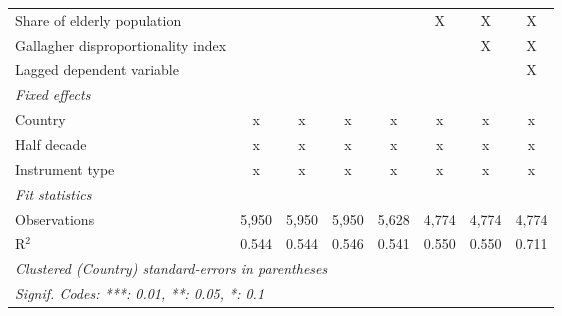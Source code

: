 \begin{tabular}{lccccccc}
   Share of elderly population                                                               &         &         &              &         & X       & X       & X\\  
   Gallagher disproportionality index                                                        &         &         &              &         &         & X       & X\\  
   Lagged dependent variable                                                                 &         &         &              &         &         &         & X\\  
   \emph{Fixed effects}\\
   Country                                                                                   & x       & x       & x            & x       & x       & x       & x\\  
   Half decade                                                                               & x       & x       & x            & x       & x       & x       & x\\  
   Instrument type                                                                           & x       & x       & x            & x       & x       & x       & x\\  
   \midrule \emph{Fit statistics}\\
   Observations                                                                              & 5,950   & 5,950   & 5,950        & 5,628   & 4,774   & 4,774   & 4,774\\  
   R$^2$                                                                                     & 0.544   & 0.544   & 0.546        & 0.541   & 0.550   & 0.550   & 0.711\\  
   \midrule
   \multicolumn{8}{l}{\emph{Clustered (Country) standard-errors in parentheses}}\\
   \multicolumn{8}{l}{\emph{Signif. Codes: ***: 0.01, **: 0.05, *: 0.1}}\\
\end{tabular}
\par\endgroup


